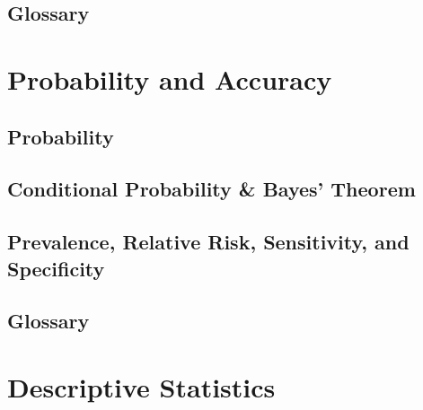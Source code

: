 







\pagestyle{plain}

\maketitle %
% 










\section*{Glossary}


\chapter{Probability and Accuracy } 
\section{Probability}
\section{Conditional Probability \& Bayes’ Theorem}
\section{Prevalence, Relative Risk, Sensitivity, and Specificity}
\section*{Glossary}

\chapter{Descriptive Statistics } 
